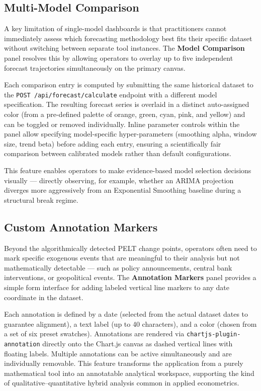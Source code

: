 \subsection{Multi-Model Comparison}
A key limitation of single-model dashboards is that practitioners cannot immediately assess which forecasting methodology best fits their specific dataset without switching between separate tool instances. The \textbf{Model Comparison} panel resolves this by allowing operators to overlay up to five independent forecast trajectories simultaneously on the primary canvas.

Each comparison entry is computed by submitting the same historical dataset to the \texttt{POST /api/forecast/calculate} endpoint with a different model specification. The resulting forecast series is overlaid in a distinct auto-assigned color (from a pre-defined palette of orange, green, cyan, pink, and yellow) and can be toggled or removed individually. Inline parameter controls within the panel allow specifying model-specific hyper-parameters (smoothing alpha, window size, trend beta) before adding each entry, ensuring a scientifically fair comparison between calibrated models rather than default configurations.

This feature enables operators to make evidence-based model selection decisions visually — directly observing, for example, whether an ARIMA projection diverges more aggressively from an Exponential Smoothing baseline during a structural break regime.


\subsection{Custom Annotation Markers}
Beyond the algorithmically detected PELT change points, operators often need to mark specific exogenous events that are meaningful to their analysis but not mathematically detectable — such as policy announcements, central bank interventions, or geopolitical events. The \textbf{Annotation Markers} panel provides a simple form interface for adding labeled vertical line markers to any date coordinate in the dataset.

Each annotation is defined by a date (selected from the actual dataset dates to guarantee alignment), a text label (up to 40 characters), and a color (chosen from a set of six preset swatches). Annotations are rendered via \texttt{chartjs-plugin-annotation} directly onto the Chart.js canvas as dashed vertical lines with floating labels. Multiple annotations can be active simultaneously and are individually removable. This feature transforms the application from a purely mathematical tool into an annotatable analytical workspace, supporting the kind of qualitative–quantitative hybrid analysis common in applied econometrics.

